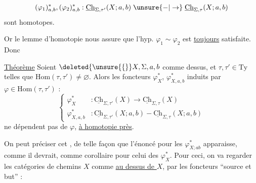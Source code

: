 
\[
(\varphi_1)_{a,b}^*,(\varphi_2)_{a,b}^*:\underline{\mathrm{Ch}}_{\Sigma,\tau'}(X;a,b)\mathrel{\unsure{-|\to}}\underline{\mathrm{Ch}}_{\Sigma,\tau}(X;a,b)
\]
sont  homotopes. 

Or le lemme d'homotopie nous assure que l'hyp. $\varphi_1\sim\varphi_2$ est \uline{toujours} satisfaite. Donc

\uline{Théorème}  Soient $\deleted{\unsure{\{} }X,\Sigma,a,b$ comme dessus, et $\tau,\tau'\in\mathrm{Ty}$ telles que $\mathrm{Hom}(\tau,\tau')\ne\varnothing$. Alors les foncteurs $\varphi_X^*$, $\varphi_{X,a,b}^*$ induits par  $\varphi\in\mathrm{Hom}(\tau,\tau')$ :
\[
\left\{\begin{aligned}
\varphi_X^* &: \underline{\mathrm{Ch}}_{\Sigma,\tau'}(X)\longrightarrow\underline{\mathrm{Ch}}_{\Sigma,\tau}(X)\\
\varphi_{X,a,b}^* &: \underline{\mathrm{Ch}}_{\Sigma,\tau'}(X;a,b)\mathrel{-}\underline{\mathrm{Ch}}_{\Sigma,\tau}(X;a,b)
\end{aligned}\right.
\]
ne dépendent pas de $\varphi$, \uline{à homotopie près}.

On peut préciser cet  , de telle façon que l'énoncé pour les $\varphi_{X;ab}^*$ apparaisse, comme il devrait, comme corollaire pour celui des $\varphi_X^*$. Pour ceci, on va regarder les catégories de chemins  $X$ comme  \uline{au dessus de $X$}, par les foncteurs ``source et but'' :

